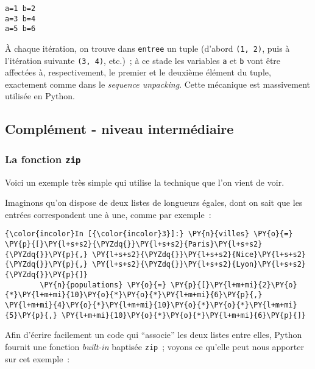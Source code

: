     \begin{Verbatim}[commandchars=\\\{\}]
a=1 b=2
a=3 b=4
a=5 b=6

    \end{Verbatim}

    À chaque itération, on trouve dans \texttt{entree} un tuple (d'abord
\texttt{(1,\ 2)}, puis à l'itération suivante \texttt{(3,\ 4)}, etc.)~;
à ce stade les variables \texttt{a} et \texttt{b} vont être affectées à,
respectivement, le premier et le deuxième élément du tuple, exactement
comme dans le \emph{sequence unpacking}. Cette mécanique est massivement
utilisée en Python.

    \hypertarget{compluxe9ment---niveau-intermuxe9diaire}{%
\subsection{Complément - niveau
intermédiaire}\label{compluxe9ment---niveau-intermuxe9diaire}}

    \hypertarget{la-fonction-zip}{%
\subsubsection{\texorpdfstring{La fonction
\texttt{zip}}{La fonction zip}}\label{la-fonction-zip}}

    Voici un exemple très simple qui utilise la technique que l'on vient de
voir.

    Imaginons qu'on dispose de deux listes de longueurs égales, dont on sait
que les entrées correspondent une à une, comme par exemple~:

    \begin{Verbatim}[commandchars=\\\{\}]
{\color{incolor}In [{\color{incolor}3}]:} \PY{n}{villes} \PY{o}{=} \PY{p}{[}\PY{l+s+s2}{\PYZdq{}}\PY{l+s+s2}{Paris}\PY{l+s+s2}{\PYZdq{}}\PY{p}{,} \PY{l+s+s2}{\PYZdq{}}\PY{l+s+s2}{Nice}\PY{l+s+s2}{\PYZdq{}}\PY{p}{,} \PY{l+s+s2}{\PYZdq{}}\PY{l+s+s2}{Lyon}\PY{l+s+s2}{\PYZdq{}}\PY{p}{]}
        \PY{n}{populations} \PY{o}{=} \PY{p}{[}\PY{l+m+mi}{2}\PY{o}{*}\PY{l+m+mi}{10}\PY{o}{*}\PY{o}{*}\PY{l+m+mi}{6}\PY{p}{,} \PY{l+m+mi}{4}\PY{o}{*}\PY{l+m+mi}{10}\PY{o}{*}\PY{o}{*}\PY{l+m+mi}{5}\PY{p}{,} \PY{l+m+mi}{10}\PY{o}{*}\PY{o}{*}\PY{l+m+mi}{6}\PY{p}{]}
\end{Verbatim}


    Afin d'écrire facilement un code qui ``associe'' les deux listes entre
elles, Python fournit une fonction \emph{built-in} baptisée
\texttt{zip}~; voyons ce qu'elle peut nous apporter sur cet exemple~:

